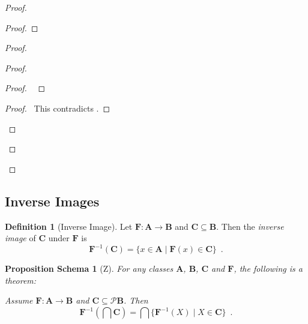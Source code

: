 \documentclass{book}
\let\qed\relax
\newtheorem{props}[ax]{Proposition Schema}
\theoremstyle{definition}
\newtheorem{df}[ax]{Definition}
\begin{document}
\begin{proof}
\pf
{}
\begin{proof}
\end{proof}
\begin{proof}
	\begin{proof}
		\begin{proof}
			\pf\ 
		\end{proof}
		\qedstep
		\begin{proof}
			\pf\ This contradicts .
		\end{proof}
	\end{proof}
\end{proof}
\qed
\end{proof}

\subsection{Inverse Images}

\begin{df}[Inverse Image]
Let $\mathbf{F} : \mathbf{A} \rightarrow \mathbf{B}$ and $\mathbf{C} \subseteq \mathbf{B}$. Then the \emph{inverse image} of $\mathbf{C}$ under $\mathbf{F}$ is
\[ \mathbf{F}^{-1}(\mathbf{C}) = \{ x \in \mathbf{A} \mid \mathbf{F}(x) \in \mathbf{C} \} \enspace . \]
\end{df}

\begin{props}[Z]
For any classes $\mathbf{A}$, $\mathbf{B}$, $\mathbf{C}$ and $\mathbf{F}$, the following is a theorem:

Assume $\mathbf{F} : \mathbf{A} \rightarrow \mathbf{B}$ and $\mathbf{C} \subseteq \mathcal{P} \mathbf{B}$. Then
\[ \mathbf{F}^{-1} \left( \bigcap \mathbf{C} \right) = \bigcap \{ \mathbf{F}^{-1}(X) \mid X \in \mathbf{C} \} \enspace . \]
\end{props}
\end{document}
